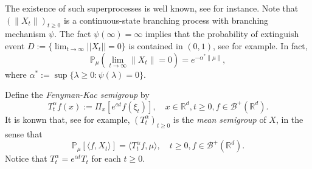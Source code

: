 \documentclass[12pt, a4paper]{amsart}
\theoremstyle{definition}
\numberwithin{equation}{section}
\begin{document}
    The existence of such superprocesses is well known, see \cite{EB} for instance. 
    Note that $(\|X_t\|)_{t\geq 0}$ is a continuous-state branching process with branching mechanism $\psi$. 
    The fact $\psi(\infty)=\infty$ implies that the probability of extinguish event $D:=\{\lim_{t \rightarrow \infty}||X_t||=0\}$ is contained in $(0,1)$, see \cite[Theorem 12.7]{Kyprianou2014Fluctuations} for example. 
    In fact, 
\begin{equation}
    \mathbb{P}_{\mu} (\lim_{t \to \infty}\|X_t\|=0 )
    = e^{-\alpha^* \|\mu\|},
\end{equation}
    where $\alpha^* := \sup\{\lambda \geq 0: \psi(\lambda) = 0\}$.

    Define the \emph{Fenyman-Kac semigroup} by  
\begin{equation}\label{meansemigroup}
    T^{\alpha}_t f(x) 
    := \Pi_x [e^{\alpha t}f(\xi_t)],
    \quad x\in \mathbb{R}^d,t\geq 0, f\in \mathscr B^+(\mathbb R^d).
\end{equation}
    It is konwn that, see \cite[Proposition 2.27]{Li2011Measure} for example, $(T^\alpha_t)_{t\geq 0}$ is the \emph{mean semigroup} of $X$, in the sense that
\begin{equation}\label{meanformula}
    \mathbb{P}_{\mu}[\langle f, X_t \rangle] 
    = \langle T_t^\alpha f, \mu \rangle,
    \quad t\geq 0, f\in \mathscr B^+(\mathbb R^d).
\end{equation}
Notice that $T^{\alpha}_t =e^{\alpha t}T_t$ for each $t \geq 0$.

\end{document}
